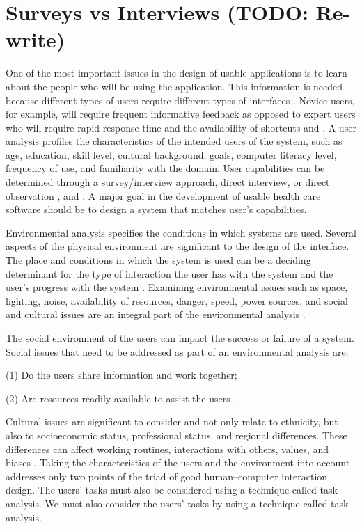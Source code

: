 \clearpage

\section{Surveys vs Interviews (TODO: Re-write)}

One of the most important issues in the design of usable applications \cite{johnson2005user} is to learn about the people who will be using the application. This information is needed because different types of users require different types of interfaces \cite{nielsen1994usability}. Novice users, for example, will require frequent informative feedback as opposed to expert users who will require rapid response time and the availability of shortcuts \cite{shneiderman1987designing} and \cite{welch1998human}. A user analysis profiles the characteristics of the intended users of the system, such as age, education, skill level, cultural background, goals, computer literacy level, frequency of use, and familiarity with the domain. User capabilities can be determined through a survey/interview approach, direct interview, or direct observation \cite{strasberg1998moving}, \cite{hackos1997user} and \cite{shneiderman1987designing}. A major goal in the development of usable health care software should be to design a system that matches user’s capabilities.

Environmental analysis specifies the conditions in which systems are used. Several aspects of the physical environment are significant to the design of the interface. The place and conditions in which the system is used can be a deciding determinant for the type of interaction the user has with the system and the user’s progress with the system \cite{bouwhuis2000parts}. Examining environmental issues such as space, lighting, noise, availability of resources, danger, speed, power sources, and social and cultural issues are an integral part of the environmental analysis \cite{hackos1997user}.

The social environment of the users can impact the success or failure of a system. Social issues that need to be addressed as part of an environmental analysis are:

(1) Do the users share information and work together;

(2) Are resources readily available to assist the users \cite{hackos1997user}.

Cultural issues are significant to consider and not only relate to ethnicity, but also to socioeconomic status, professional status, and regional differences. These differences can affect working routines, interactions with others, values, and biases \cite{hackos1997user}. Taking the characteristics of the users and the environment into account addresses only two points of the triad of good human–computer interaction design. The users’ tasks must also be considered using a technique called task analysis. We must also consider the users’ tasks by using a technique called task analysis.

